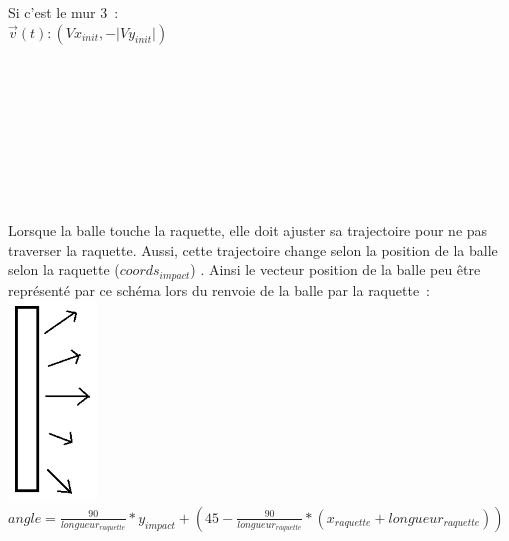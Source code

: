 \documentclass{report}
\begin{document}
Si c’est le mur 3 :\\
$\vec{v}(t):(Vx_{init},-\lvert Vy_{init} \rvert)$\\
\\
\\
\\
\\
\\
\\
\\
\\
\\
Lorsque la balle touche la raquette, elle doit ajuster sa trajectoire pour ne pas traverser la raquette. Aussi, cette trajectoire change selon la position de la balle selon la raquette ($coords_{impact}$) . Ainsi le vecteur position de la balle peu être représenté par ce schéma lors du renvoie de la balle par la raquette : \\
\includegraphics{raquette}\\

$angle = \frac{90}{longueur_{raquette}}*y_{impact}+(45-\frac{90}{longueur_{raquette}}*(x_{raquette}+longueur_{raquette}))$
\end{document}
